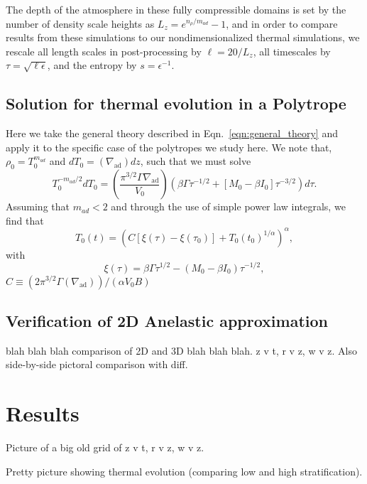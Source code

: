 \documentclass[twocolumn, amsmath, amsfonts, amssymb, trackchanges]{aastex62}
\newcommand{\grad}{\ensuremath{\nabla}}
\begin{document}
The depth of the atmosphere in these fully compressible domains is set by the number of density
scale heights as $L_z = e^{n_\rho/m_{ad}} - 1$, and in order to compare results from these
simulations to our nondimensionalized thermal simulations, we rescale all length scales in
post-processing by $\ell = 20/L_z$, all timescales by $\tau = \sqrt{\ell \epsilon}$, and
the entropy by $s = \epsilon^{-1}$.


\subsection{Solution for thermal evolution in a Polytrope}
Here we take the general theory described in Eqn.~\ref{eqn:general_theory} and apply it
to the specific case of the polytropes we study here. 
We note that, $\rho_0 = T_0^{m_{ad}}$ and
$dT_0 = (\grad_{\text{ad}}) dz$, such that we must solve
\begin{equation}
T_0^{-m_{ad}/2} dT_0 
= \left(\frac{\pi^{3/2}\Gamma\grad_{\text{ad}}}{V_0}\right)
\left(\beta\Gamma\tau^{-1/2} + [M_0 - \beta I_0]\tau^{-3/2}\right)d\tau.
\label{eqn:general_theory}
\end{equation}
Assuming that $m_{ad} < 2$ and through the use of simple power law integrals, we
find that
\begin{equation}
T_0(t) = \left(C[\xi(\tau) - \xi(\tau_0)] + T_0(t_0)^{1/\alpha}  \right)^{\alpha},
\end{equation}
with
\begin{equation}
\xi(\tau) = \beta\Gamma\tau^{1/2} - (M_0 - \beta I_0) \tau^{-1/2},
\end{equation}
$C \equiv (2 \pi^{3/2} \Gamma (\grad_{\text{ad}}))/(\alpha V_0 B)$



\subsection{Verification of 2D Anelastic approximation}
blah blah blah comparison of 2D and 3D blah blah blah. z v t, r v z, w v z. Also side-by-side
pictoral comparison with diff. 

\section{Results}
\label{sec:results}
Picture of a big old grid of z v t, r v z, w v z.

Pretty picture showing thermal evolution (comparing low and high stratification).
\end{document}
